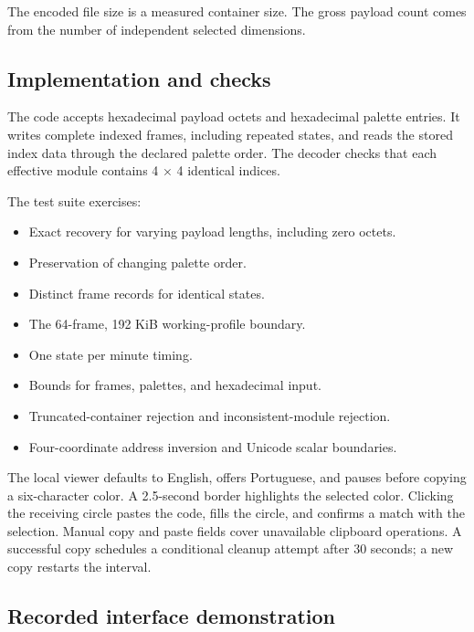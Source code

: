 \documentclass[
  11pt,
  a4paper,
]{article}
\providecommand{\tightlist}{%
  \setlength{\itemsep}{0pt}\setlength{\parskip}{0pt}}
\begin{document}
The encoded file size is a measured container size. The gross payload
count comes from the number of independent selected dimensions.

\hypertarget{implementation-and-checks}{%
\subsection{Implementation and checks}\label{implementation-and-checks}}

The code accepts hexadecimal payload octets and hexadecimal palette
entries. It writes complete indexed frames, including repeated states,
and reads the stored index data through the declared palette order. The
decoder checks that each effective module contains 4 × 4 identical
indices.

The test suite exercises:

\begin{itemize}
\tightlist
\item
  Exact recovery for varying payload lengths, including zero octets.
\item
  Preservation of changing palette order.
\item
  Distinct frame records for identical states.
\item
  The 64-frame, 192 KiB working-profile boundary.
\item
  One state per minute timing.
\item
  Bounds for frames, palettes, and hexadecimal input.
\item
  Truncated-container rejection and inconsistent-module rejection.
\item
  Four-coordinate address inversion and Unicode scalar boundaries.
\end{itemize}

The local viewer defaults to English, offers Portuguese, and pauses
before copying a six-character color. A 2.5-second border highlights the
selected color. Clicking the receiving circle pastes the code, fills the
circle, and confirms a match with the selection. Manual copy and paste
fields cover unavailable clipboard operations. A successful copy
schedules a conditional cleanup attempt after 30 seconds; a new copy
restarts the interval.

\hypertarget{recorded-interface-demonstration}{%
\subsection{Recorded interface
demonstration}\label{recorded-interface-demonstration}}
\end{document}
